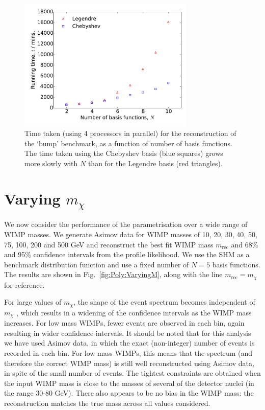 \begin{figure}[t]
\centering
  \includegraphics[width=0.75\textwidth]{Poly/RunTimes.pdf}
  \caption[Time taken for the reconstruction of the `bump' benchmark as a function of number of basis functions for both the Chebyshev and Legendre bases.]{Time taken (using 4 processors in parallel) for the reconstruction of the `bump' benchmark, as a function of number of basis functions. The time taken using the Chebyshev basis (blue squares) grows more slowly with $N$ than for the Legendre basis (red triangles).}
  \label{fig:Poly:times}
\end{figure}

\section{Varying $m_\chi$}
\label{sec:Poly:mass}

We now consider the performance of the parametrisation over a wide range of WIMP masses. We generate Asimov data for WIMP masses of 10, 20, 30, 40, 50, 75, 100, 200 and 500 GeV and reconstruct the best fit WIMP mass $m_\textrm{rec}$ and 68\% and 95\% confidence intervals from the profile likelihood. We use the SHM as a benchmark distribution function and use a fixed number of $N=5$ basis functions. The results are shown in Fig.~\ref{fig:Poly:VaryingM}, along with the line $m_\textrm{rec} = m_\chi$ for reference.

For large values of $m_\chi$, the shape of the event spectrum becomes independent of $m_\chi$ \cite{Green:2008}, which results in a widening of the confidence intervals as the WIMP mass increases. For low mass WIMPs, fewer events are observed in each bin, again resulting in wider confidence intervals. It should be noted that for this analysis we have used Asimov data, in which the exact (non-integer) number of events is recorded in each bin. For low mass WIMPs, this means that the spectrum (and therefore the correct WIMP mass) is still well reconstructed using Asimov data, in spite of the small number of events. The tightest constraints are obtained when the input WIMP mass is close to the masses of several of the detector nuclei (in the range 30-80 GeV). There also appears to be no bias in the WIMP mass: the reconstruction matches the true mass across all values considered.

